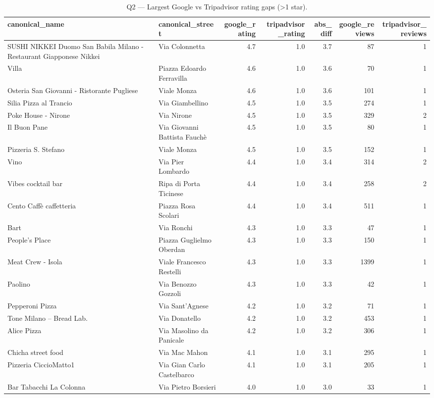 \begin{table}[ht]
\centering
\caption{Q2 — Largest Google vs Tripadvisor rating gaps (>1 star).}
\label{tab:q2_top_google_vs_tripadvisor}
{\tiny
\begin{tabular}{llrrrrr}
\toprule
canonical\_name & canonical\_street & google\_rating & tripadvisor\_rating & abs\_diff & google\_reviews & tripadvisor\_reviews \\
\midrule
SUSHI NIKKEI Duomo San Babila Milano - Restaurant Giapponese Nikkei & Via Colonnetta & 4.7 & 1.0 & 3.7 & 87 & 1 \\
Villa & Piazza Edoardo Ferravilla & 4.6 & 1.0 & 3.6 & 70 & 1 \\
Osteria San Giovanni - Ristorante Pugliese & Viale Monza & 4.6 & 1.0 & 3.6 & 101 & 1 \\
Silia Pizza al Trancio & Via Giambellino & 4.5 & 1.0 & 3.5 & 274 & 1 \\
Poke House - Nirone & Via Nirone & 4.5 & 1.0 & 3.5 & 329 & 2 \\
Il Buon Pane & Via Giovanni Battista Fauchè & 4.5 & 1.0 & 3.5 & 80 & 1 \\
Pizzeria S. Stefano & Viale Monza & 4.5 & 1.0 & 3.5 & 152 & 1 \\
Vino & Via Pier Lombardo & 4.4 & 1.0 & 3.4 & 314 & 2 \\
Vibes cocktail bar & Ripa di Porta Ticinese & 4.4 & 1.0 & 3.4 & 258 & 2 \\
Cento Caffè caffetteria & Piazza Rosa Scolari & 4.4 & 1.0 & 3.4 & 511 & 1 \\
Bart & Via Ronchi & 4.3 & 1.0 & 3.3 & 47 & 1 \\
People’s Place & Piazza Guglielmo Oberdan & 4.3 & 1.0 & 3.3 & 150 & 1 \\
Meat Crew - Isola & Viale Francesco Restelli & 4.3 & 1.0 & 3.3 & 1399 & 1 \\
Paolino & Via Benozzo Gozzoli & 4.3 & 1.0 & 3.3 & 42 & 1 \\
Pepperoni Pizza & Via Sant'Agnese & 4.2 & 1.0 & 3.2 & 71 & 1 \\
Tone Milano – Bread Lab. & Via Donatello & 4.2 & 1.0 & 3.2 & 453 & 1 \\
Alice Pizza & Via Masolino da Panicale & 4.2 & 1.0 & 3.2 & 306 & 1 \\
Chicha street food & Via Mac Mahon & 4.1 & 1.0 & 3.1 & 295 & 1 \\
Pizzeria CiccioMatto1 & Via Gian Carlo Castelbarco & 4.1 & 1.0 & 3.1 & 205 & 1 \\
Bar Tabacchi La Colonna & Via Pietro Borsieri & 4.0 & 1.0 & 3.0 & 33 & 1 \\
\bottomrule
\end{tabular}
}
\end{table}
